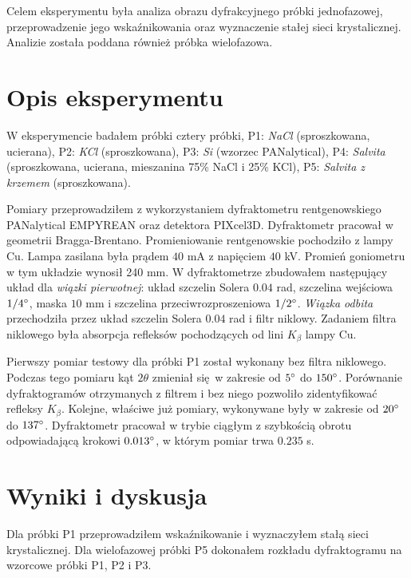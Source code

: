 \documentclass[polish,]{article}
\begin{document}
Celem eksperymentu była analiza obrazu dyfrakcyjnego próbki
jednofazowej, przeprowadzenie jego wskaźnikowania oraz wyznaczenie
stałej sieci krystalicznej. Analizie została poddana również próbka
wielofazowa.

\section{Opis eksperymentu}\label{opis-eksperymentu}

W eksperymencie badałem próbki cztery próbki, P1: \emph{NaCl}
(sproszkowana, ucierana), P2: \emph{KCl} (sproszkowana), P3: \emph{Si}
(wzorzec PANalytical), P4: \emph{Salvita} (sproszkowana, ucierana,
mieszanina 75\% NaCl i 25\% KCl), P5: \emph{Salvita z krzemem}
(sproszkowana).

Pomiary przeprowadziłem z wykorzystaniem dyfraktometru rentgenowskiego
PANalytical EMPYREAN oraz detektora PIXcel3D. Dyfraktometr pracował w
geometrii Bragga-Brentano. Promieniowanie rentgenowskie pochodziło z
lampy Cu. Lampa zasilana była prądem \(40\) mA z napięciem \(40\) kV.
Promień goniometru w tym układzie wynosił 240 mm. W dyfraktometrze
zbudowałem następujący układ dla \emph{wiązki pierwotnej}: układ
szczelin Solera \(0.04\) rad, szczelina wejściowa \(1/4\degree\), maska
\(10\) mm i szczelina przeciwrozproszeniowa \(1/2\degree\). \emph{Wiązka
odbita} przechodziła przez układ szczelin Solera \(0.04\) rad i filtr
niklowy. Zadaniem filtra niklowego była absorpcja refleksów pochodzących
od lini \(K_{\beta}\) lampy Cu.

Pierwszy pomiar testowy dla próbki P1 został wykonany bez filtra
niklowego. Podczas tego pomiaru kąt \(2\theta\) zmieniał się~w zakresie
od \(5\degree\) do \(150\degree\). Porównanie dyfraktogramów otrzymanych
z filtrem i bez niego pozwoliło zidentyfikować refleksy \(K_{\beta}\).
Kolejne, właściwe już pomiary, wykonywane były w zakresie od
\(20\degree\) do \(137\degree\). Dyfraktometr pracował w trybie ciągłym
z szybkością obrotu odpowiadającą krokowi \(0.013\degree\), w którym
pomiar trwa \(0.235\) s.

\section{Wyniki i dyskusja}\label{wyniki-i-dyskusja}

Dla próbki P1 przeprowadziłem wskaźnikowanie i wyznaczyłem stałą sieci
krystalicznej. Dla wielofazowej próbki P5 dokonałem rozkładu
dyfraktogramu na wzorcowe próbki P1, P2 i P3.
\end{document}
